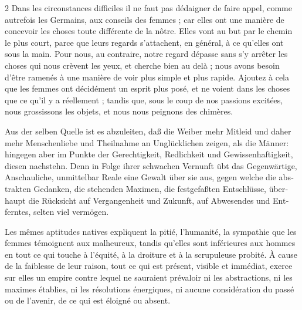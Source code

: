 \documentclass[a4paper,12pt]{article}
\newcommand\chunks[2]{%
\begin{leftcolumn*}\begin{otherlanguage}{german}%
{#1}%
\end{otherlanguage}\end{leftcolumn*}%
\begin{rightcolumn}\begin{otherlanguage}{french}%
{#2}%
\end{otherlanguage}\end{rightcolumn}%
}
\begin{document}
\begin{paracol}{2}
         {Dans les circonstances difficiles il ne faut pas dédaigner de faire appel, comme autrefois les Germains, aux conseils des femmes ; car elles ont une manière de concevoir les choses toute différente de la nôtre. Elles vont au but par le chemin le plus court, parce que leurs regards s’attachent, en général, à ce qu’elles ont sous la main. Pour nous, au contraire, notre regard dépasse sans s’y arrêter les choses qui nous crèvent les yeux, et cherche bien au delà ; nous avons besoin d’être ramenés à une manière de voir plus simple et plus rapide. Ajoutez à cela que les femmes ont décidément un esprit plus posé, et ne voient dans les choses que ce qu’il y a réellement ; tandis que, sous le coup de nos passions excitées, nous grossissons les objets, et nous nous peignons des chimères.}
  \chunks{Aus der selben Quelle ist es abzuleiten, daß die Weiber mehr Mitleid und daher mehr Menschenliebe und Theilnahme an Unglücklichen zeigen, als die Männer: hingegen aber im Punkte der Gerechtigkeit, Redlichkeit und Gewissenhaftigkeit, diesen nachstehn. Denn in Folge ihrer schwachen Vernunft übt das Gegenwärtige, Anschauliche, unmittelbar Reale eine Gewalt über sie aus, gegen welche die abstrakten Gedanken, die stehenden Maximen, die festgefaßten Entschlüsse, überhaupt die Rücksicht auf Vergangenheit und Zukunft, auf Abwesendes und Entferntes, selten viel vermögen.}
         {Les mêmes aptitudes natives expliquent la pitié, l’humanité, la sympathie que les femmes témoignent aux malheureux, tandis qu’elles sont inférieures aux hommes en tout ce qui touche à l’équité, à la droiture et à la scrupuleuse probité. À cause de la faiblesse de leur raison, tout ce qui est présent, visible et immédiat, exerce sur elles un empire contre lequel ne sauraient prévaloir ni les abstractions, ni les maximes établies, ni les résolutions énergiques, ni aucune considération du passé ou de l’avenir, de ce qui est éloigné ou absent.}

\end{paracol}
\end{document}
